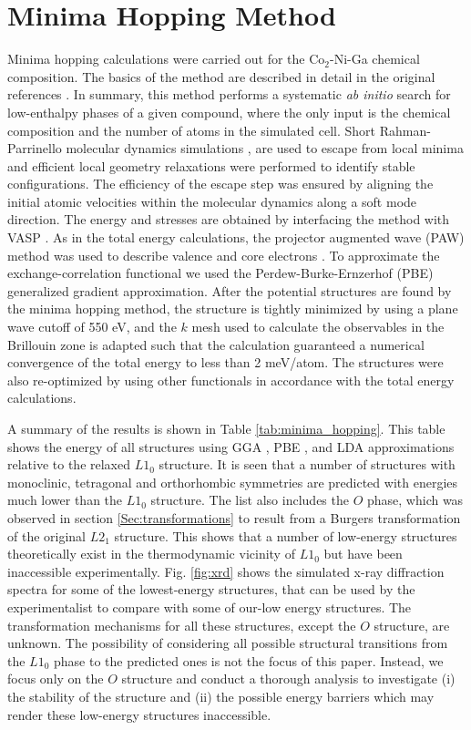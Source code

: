 \documentclass[%
preprint,
 amsmath,amssymb,
 aps,
prb,
showkeys,
]{revtex4-1}
\begin{document}
\section{Minima Hopping Method}
\label{Sec:MHM}
Minima hopping calculations were carried out for the Co$_2$-Ni-Ga chemical composition. The basics of the method are described in detail in the original references \cite{Goedecker2004,Amsler2010}. In summary, this method
performs a systematic \textit{ab initio} search for low-enthalpy phases of a given compound, where the only input is the chemical composition and the number of atoms in the simulated cell.
Short Rahman-Parrinello molecular dynamics simulations \cite{parrinello1981polymorphic}, are used to escape from local minima and 
efficient local geometry relaxations were performed to identify stable configurations. The efficiency of the escape step was ensured by aligning the initial atomic velocities within the molecular dynamics along a soft mode direction.
The energy and stresses are obtained by interfacing the method with VASP \cite{Kresse1996}. As in the total energy calculations, the projector augmented wave (PAW) method was used to describe valence and core electrons \cite{blochl1994}. To approximate the exchange-correlation functional we used the
Perdew-Burke-Ernzerhof (PBE) \cite{Perdew1996} generalized gradient
approximation. After the potential structures are found by the minima hopping method, the structure is tightly minimized by using a plane wave cutoff of 550 eV, and the $k$ mesh used to calculate the observables in the Brillouin zone is adapted such that the calculation guaranteed a numerical convergence of the total energy to less than 2 meV/atom. The structures were also re-optimized by using other functionals in accordance with the total energy calculations.

A summary of the results is shown in Table \ref{tab:minima_hopping}. This table shows the energy of all structures using GGA \cite{Perdew1992}, PBE \cite{Perdew1996}, and LDA \cite{LDA} approximations relative to the relaxed  $L1_0$ structure.
It is seen that a number of structures with monoclinic, tetragonal and orthorhombic symmetries are predicted with energies much lower than the $L1_0$ structure. The list also includes the $O$ phase, which was observed in section \ref{Sec:transformations} to result from a Burgers transformation of the original $L2_1$ structure. This shows that a number of low-energy structures theoretically exist in the thermodynamic vicinity of $L1_0$ but have been inaccessible experimentally. Fig. \ref{fig:xrd} shows the simulated x-ray diffraction  spectra for some of the lowest-energy structures, that can be used by the experimentalist to compare with some of our-low energy structures. The transformation mechanisms for all these structures, except the $O$ structure, are unknown. The possibility of considering all possible structural transitions from the $L1_0$ phase to the predicted ones is not the focus of this paper. Instead, we  focus only on the  $O$  structure and conduct a thorough analysis to investigate (i) the 
stability of the structure and (ii) the possible energy barriers which may render these low-energy structures inaccessible.
\end{document}
